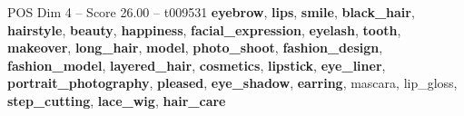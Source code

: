 \begin{textsample}{POS Dim 4 – Score 26.00 – t009531}  \label{ex:f4_pos_007}
\textbf{eyebrow}, \textbf{lips}, \textbf{smile}, \textbf{black\_hair}, \textbf{hairstyle}, \textbf{beauty}, \textbf{happiness}, \textbf{facial\_expression}, \textbf{eyelash}, \textbf{tooth}, \textbf{makeover}, \textbf{long\_hair}, \textbf{model}, \textbf{photo\_shoot}, \textbf{fashion\_design}, \textbf{fashion\_model}, \textbf{layered\_hair}, \textbf{cosmetics}, \textbf{lipstick}, \textbf{eye\_liner}, \textbf{portrait\_photography}, \textbf{pleased}, \textbf{eye\_shadow}, \textbf{earring}, mascara, lip\_gloss, \textbf{step\_cutting}, \textbf{lace\_wig}, \textbf{hair\_care}

\end{textsample}
